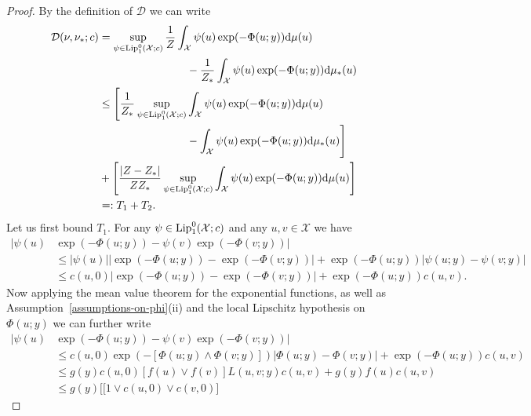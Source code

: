 \documentclass[final]{siamart171218}
\newcommand{\mcl}{\mathcal}
\newcommand{\dd}{\text{d}}
\newcommand{\Lip}{{\rm Lip}_1}
\newcommand{\mX}{\mcl{X}}
\newcommand{\cc}{c}
\newcommand{\K}{\mathcal{D}}
\begin{document}
\begin{proof}
  By the definition of $\K$ we can write
  \begin{equation*}
    \begin{aligned}
    \K( \nu, \nu_\ast; \cc)
    & = \sup_{\psi \in \Lip^0(\mX; \cc)} \frac{1}{Z} \int_\mX \psi(u) \exp (-\Phi(u;y)) \dd \mu(u) \\
    & \qquad \qquad \qquad \qquad - \frac{1}{Z_\ast}  \int_\mX \psi(u) \exp (-\Phi(u;y)) \dd \mu_\ast(u) \\
    & \le \Bigg[ \frac{1}{Z_\ast} \sup_{\psi \in \Lip^0(\mX; \cc)}
       \int_\mX \psi(u) \exp (-\Phi(u;y)) \dd \mu(u) \\
    &  \qquad \qquad \qquad \qquad  - \int_\mX \psi(u) \exp (-\Phi(u;y)) \dd \mu_\ast(u) \Bigg] \\
    &  + \Bigg[ \frac{|Z - Z_\ast|}{Z Z_\ast}  \sup_{\psi \in \Lip^0(\mX; \cc)}
    \int_\mX \psi(u) \exp ( - \Phi(u;y)) \dd \mu(u) \Bigg] \\
    & =: T_1 + T_2. 
  \end{aligned}
  \end{equation*}
  Let us first bound $T_1$. For any $\psi \in \Lip^0(\mX; \cc)$ and any $u,v \in \mX$ we have
  \begin{equation*}
    \begin{aligned}
      |\psi(u) &\exp( - \Phi(u;y)) - \psi(v) \exp( - \Phi(v;y) )| \\
      & \le |\psi(u)| | \exp( - \Phi(u;y)) - \exp( - \Phi(v;y)) |  + \exp( -\Phi(u;y)) | \psi(u;y) - \psi(v;y)| \\
      & \le \cc(u, 0)   | \exp( - \Phi(u;y)) - \exp( - \Phi(v;y)) |  + \exp( -\Phi(u;y)) \cc(u, v).
    \end{aligned}
  \end{equation*}
  Now applying the mean value theorem for the exponential functions, as well as Assumption~\ref{assumptions-on-phi}(ii) and the local Lipschitz hypothesis on $\Phi(u;y)$ we can further write
  \begin{equation*}
    \begin{aligned}
      |\psi(u) &\exp( - \Phi(u;y)) - \psi(v) \exp( - \Phi(v;y) )| \\
      & \le \cc(u, 0) \exp \left( - [\Phi(u;y) \wedge \Phi(v;y) ] \right)   |  \Phi(u;y) -  \Phi(v;y) |
      + \exp( -\Phi(u;y)) \cc(u, v) \\
      & \le  g(y) \cc(u, 0)\left[ f(u) \vee f(v) \right] L(u,v; y) \cc(u,v)
      + g(y) f(u) \cc(u,v)  \\
      & \le g(y) \bigg[ \big[1 \vee \cc(u,0) \vee \cc(v,0)\big]

\end{aligned}
\end{equation*}
\end{proof}
\end{document}
